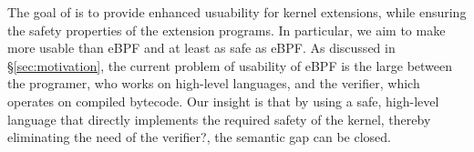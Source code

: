 
%


The goal of \projname{} is to provide enhanced usuability for kernel extensions,
    while ensuring the safety properties of the extension programs.
In particular, we aim to make \projname{} more usable than eBPF and at least
    as safe as eBPF.
As discussed in \S\ref{sec:motivation}, the current problem of usability of
    eBPF is the large \gap{} between the programer, who works on
    high-level languages, and the verifier, which operates on compiled bytecode.
Our insight is that by using a safe, high-level language that directly
    implements the required safety of the kernel, thereby eliminating the need
    of the verifier?, the semantic gap can be
    closed.

